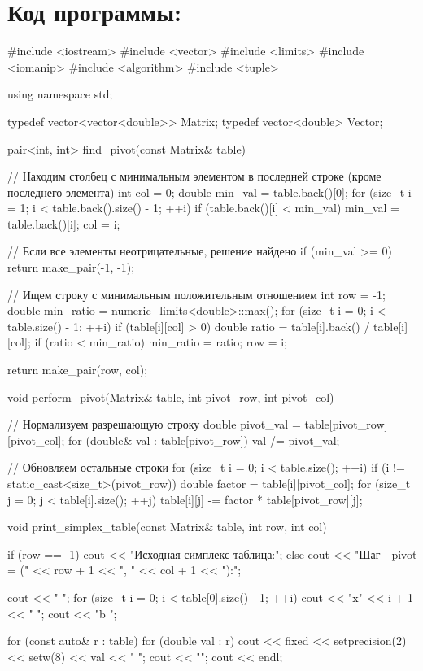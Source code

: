 \documentclass{report}
\begin{document}
	\section{Код программы:}
	\begin{code}
#include <iostream>
#include <vector>
#include <limits>
#include <iomanip>
#include <algorithm>
#include <tuple>  

using namespace std;

typedef vector<vector<double>> Matrix;
typedef vector<double> Vector;

pair<int, int> find_pivot(const Matrix& table) {
	// Находим столбец с минимальным элементом в последней строке (кроме последнего элемента)
	int col = 0;
	double min_val = table.back()[0];
	for (size_t i = 1; i < table.back().size() - 1; ++i) {
		if (table.back()[i] < min_val) {
			min_val = table.back()[i];
			col = i;
		}
	}
	
	// Если все элементы неотрицательные, решение найдено
	if (min_val >= 0) {
		return make_pair(-1, -1);
	}
	
	// Ищем строку с минимальным положительным отношением
	int row = -1;
	double min_ratio = numeric_limits<double>::max();
	for (size_t i = 0; i < table.size() - 1; ++i) {
		if (table[i][col] > 0) {
			double ratio = table[i].back() / table[i][col];
			if (ratio < min_ratio) {
				min_ratio = ratio;
				row = i;
			}
		}
	}
	
	return make_pair(row, col);
}

void perform_pivot(Matrix& table, int pivot_row, int pivot_col) {
	// Нормализуем разрешающую строку
	double pivot_val = table[pivot_row][pivot_col];
	for (double& val : table[pivot_row]) {
		val /= pivot_val;
	}
	
	// Обновляем остальные строки
	for (size_t i = 0; i < table.size(); ++i) {
		if (i != static_cast<size_t>(pivot_row)) {
			double factor = table[i][pivot_col];
			for (size_t j = 0; j < table[i].size(); ++j) {
				table[i][j] -= factor * table[pivot_row][j];
			}
		}
	}
}

void print_simplex_table(const Matrix& table, int row, int col) {
	if (row == -1) {
		cout << "Исходная симплекс-таблица:\n";
	}
	else {
		cout << "Шаг - pivot = (" << row + 1 << ", " << col + 1 << "):\n";
	}
	
	cout << "     ";  
	for (size_t i = 0; i < table[0].size() - 1; ++i) {
		cout << "x" << i + 1 << "        ";
	}
	cout << "b       \n";
	
	for (const auto& r : table) {
		for (double val : r) {
			cout << fixed << setprecision(2) << setw(8) << val << "  ";
		}
		cout << "\n";
	}
	cout << endl;
}


\end{code}
\end{document}
